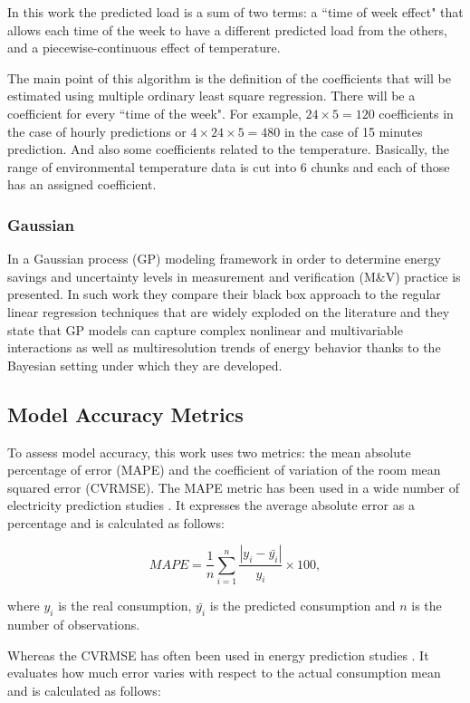 \documentclass[10pt, conference, compsocconf]{IEEEtran}
\begin{document}
In this work the predicted load is a sum of two terms: a ``time of week effect" that allows each time of the week to have a different predicted load from the others, and a piecewise-continuous effect of temperature. 

The main point of this algorithm is the definition of the coefficients that will be estimated using multiple ordinary least square regression. There will be a coefficient for every ``time of the week". For example, $24 \times 5 = 120$ coefficients in the case of hourly predictions or  $4\times 24 \times 5 = 480$ in the case of 15 minutes prediction. And also some coefficients related to the temperature. Basically, the range of environmental temperature data is cut into 6 chunks and each of those has an assigned coefficient.

\subsubsection{Gaussian}

In \cite{heo2012gaussian} a Gaussian process (GP) modeling framework in order to determine energy savings and uncertainty levels in measurement and verification (M\&V) practice is presented.  In such work they compare their black box approach to the regular linear regression techniques that are widely exploded on the literature and they state that GP models can capture complex nonlinear and multivariable interactions as well as multiresolution trends of energy behavior thanks to the Bayesian setting under which they are developed. 

\subsection{Model Accuracy Metrics}

To assess model accuracy, this work uses two metrics: the mean absolute percentage of error (MAPE) and the coefficient of variation of the room mean squared error (CVRMSE).
The MAPE metric has been used in a wide number of electricity prediction studies \cite{fan2014development, edwards2012predicting}
. It expresses the average absolute error as a percentage and is calculated as follows:

\[
 MAPE = \frac{1}{n}\sum_{i=1}^{n} \frac{|y_i-\bar{y_i}|}{y_i}\times 100,
\]

where $y_i$ is the real consumption, $\bar{y_i}$ is the predicted consumption and $n$ is the number of observations.

Whereas the CVRMSE has often been used in energy prediction studies \cite{quilumba2015using} %
. It evaluates how much error varies with respect
to the actual consumption mean and is calculated as follows:
\end{document}

